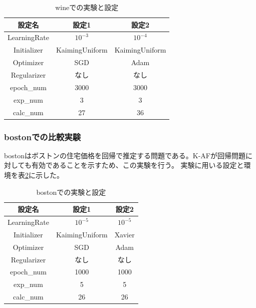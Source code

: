 \begin{table}[htbp]
    \begin{center}
        \caption{wineでの実験と設定}
        \label{exp:wine}
        \vspace{2mm} 
        \begin{tabular}{ |c|c|c| }
        \hline
        設定名 & 設定1 & 設定2 \\
        \hline
        LearningRate         & $ 10^{-3} $ & $ 10^{-4} $ \\
        \hline
        Initializer       & KaimingUniform & KaimingUniform \\
        \hline
        Optimizer           & SGD & Adam \\
        \hline
        Regularizer     & なし & なし \\
        \hline
        epoch\_num       & 3000 &  3000 \\
        \hline
        exp\_num         & 3 & 3 \\
        \hline
        calc\_num        & 27 & 36 \\
        \hline
        \end{tabular}
    \end{center}
\end{table}


\subsubsection{bostonでの比較実験}
\label{impl:boston}

bostonはボストンの住宅価格を回帰で推定する問題である。K-AFが回帰問題に対しても有効であることを示すため、この実験を行う。
実験に用いる設定と環境を表\ref{exp:boston}に示した。

\begin{table}[htbp]
    \begin{center}
        \caption{bostonでの実験と設定}
        \label{exp:boston}
        \vspace{2mm} 
        \begin{tabular}{ |c|c|c| }
        \hline
        設定名 & 設定1 & 設定2 \\
        \hline
        LearningRate         & $ 10^{-5} $ & $ 10^{-5} $ \\
        \hline
        Initializer       & KaimingUniform  & Xavier \\
        \hline
        Optimizer           & SGD & Adam \\
        \hline
        Regularizer     & なし & なし \\
        \hline
        epoch\_num       & 1000 &  1000 \\
        \hline
        exp\_num         & 5 & 5 \\
        \hline
        calc\_num        & 26 & 26 \\
        \hline
        \end{tabular}
    \end{center}
\end{table}

